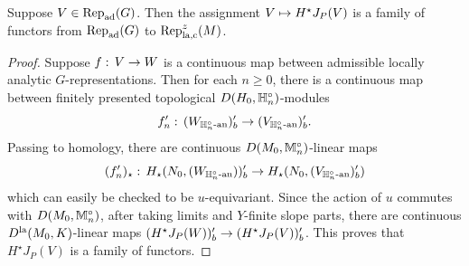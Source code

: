 \documentclass[10pt]{amsart}
\begin{document}
\begin{proposition}
Suppose $V\in \textnormal{Rep}_{\textnormal{ad}}(G)$. Then the assignment $V\mapsto H^{\star}J_{P}(V)$ is a family of functors from $\textnormal{Rep}_{\textnormal{ad}}(G)$ to $\textnormal{Rep}_{\textnormal{la,c}}^{z}(M)$.
\end{proposition}
\begin{proof}
Suppose $f:\,V\rightarrow W$ is a continuous map between admissible locally analytic $G$-representations. Then for each $n\geq 0$, there is a continuous map between finitely presented topological $D(H_{0},\mathbb{H}_{n}^{\circ})$-modules \begin{equation*}
    f_{n}^{\prime}:\, (W_{\mathbb{H}_{n}^{\circ}\textnormal{-an}})_{b}^{\prime} \rightarrow (V_{\mathbb{H}_{n}^{\circ}\textnormal{-an}})^{\prime}_{b}. 
\end{equation*} Passing to homology, there are continuous $D(M_{0},\mathbb{M}_{n}^{\circ})$-linear maps \begin{equation*}
    (f_{n}^{\prime})_{\star}:\, H_{\star}(N_{0},(W_{\mathbb{H}_{n}^{\circ}\textnormal{-an}}))_{b}^{\prime} \rightarrow H_{\star}(N_{0},(V_{\mathbb{H}_{n}^{\circ}\textnormal{-an}})^{\prime}_{b}) 
\end{equation*} which can easily be checked to be $u$-equivariant. Since the action of $u$ commutes with $D(M_{0},\mathbb{M}_{n}^{\circ})$, after taking limits and $Y$-finite slope parts, there are continuous  $D^{\textnormal{la}}(M_{0},K)$-linear maps $(H^{\star}J_{P}(W))^{\prime}_{b}\rightarrow (H^{\star}J_{P}(V))^{\prime}_{b}$. This proves that $H^{\star}J_{P}(V)$ is a family of functors.


\end{proof}
\end{document}
